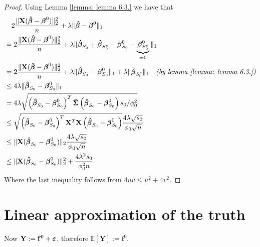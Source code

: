 \begin{proof}
    Using Lemma \ref{lemma: lemma 6.3.} we have that
    \begin{align*}
         & \quad 2 \frac{\|\mathbf{X}(\boldsymbol{\hat{\beta}}-\boldsymbol{\beta}^{0})\|_{2}^{2}}{n} + \lambda\|\boldsymbol{\hat{\beta}}-\boldsymbol{\beta}^{0}\|_{1}                                                                                                    \\
         & = 2 \frac{\|\mathbf{X}(\boldsymbol{\hat{\beta}}-\boldsymbol{\beta}^{0})\|_{2}^{2}}{n} + \lambda \| \boldsymbol{\hat{\beta}}_{S_0} + \boldsymbol{\hat{\beta}}_{S_{0}^{c}} - \boldsymbol{\beta}^{0}_{S_0} - \underbrace{\boldsymbol{\beta}^{0}_{S_0^c}}_{=0} \|_{1}                            \\
         & = 2 \frac{\|\mathbf{X}(\boldsymbol{\hat{\beta}}-\boldsymbol{\beta}^{0})\|_{2}^{2}}{n} + \lambda \| \boldsymbol{\hat{\beta}}_{S_0} - \boldsymbol{\beta}^{0}_{S_0} \|_{1} + \lambda \| \boldsymbol{\hat{\beta}}_{S_{0}^{c}} \|_1 \quad \textit{(by lemma \ref{lemma: lemma 6.3.})} \\
         & \leq 4 \lambda \|\boldsymbol{\hat{\beta}}_{S_{0}} - \boldsymbol{\beta}_{S_{0}}^{0} \|_{1}                                                                                                                                      \\
         & = 4 \lambda \sqrt{\left( \boldsymbol{\hat{\beta}}_{S_{0}} - \boldsymbol{\beta}_{S_{0}}^{0} \right)^{T} \boldsymbol{\hat{\Sigma}} \left( \boldsymbol{\hat{\beta}}_{S_{0}} - \boldsymbol{\beta}_{S_{0}}^{0}  \right) s_{0} / \phi_{0}^{2}}                                        \\
         & \leq \sqrt{\left( \boldsymbol{\hat{\beta}}_{S_{0}} - \boldsymbol{\beta}_{S_{0}}^{0} \right)^{T} \mathbf{X}^T \mathbf{X} \left( \boldsymbol{\hat{\beta}}_{S_{0}} - \boldsymbol{\beta}_{S_{0}}^{0}  \right)} \frac{4 \lambda \sqrt{s_{0}}}{\phi_{0} \sqrt{n}}                   \\
         & \leq \| \mathbf{X} ( \boldsymbol{\hat{\beta}}_{S_{0}} - \boldsymbol{\beta}_{S_{0}}^{0} ) \|_2 \frac{4 \lambda \sqrt{s_{0}}}{\phi_{0} \sqrt{n}}                                                                                         \\
         & \leq \| \mathbf{X} ( \boldsymbol{\hat{\beta}}_{S_{0}} - \boldsymbol{\beta}_{S_{0}}^{0} ) \|^2_2 + \frac{4 \lambda^2 s_{0}}{\phi^2_{0} n}                                                                                               \\
    \end{align*}
    Where the last inequality follows from $4uv \leq u^2 + 4v^2$.
\end{proof}


\section{Linear approximation of the truth}

Now $\mathbf{Y} :=\mathbf{f}^{0} + \boldsymbol{\varepsilon}$, therefore $\mathbb{E} [\mathbf{Y}] :=\mathbf{f}^{0}$.


